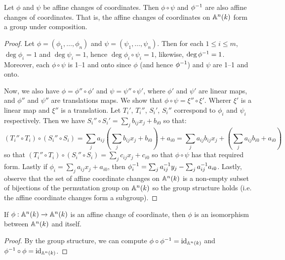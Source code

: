 \begin{theorem}\label{theorem_2.2.3}
  Let $\phi$ and $\psi$ be affine changes of coordinates. Then $\phi \circ \psi$
  and $\phi^{-1}$ are also affine changes of coordinates. That is, the affine
  changes of coordinates on $\mathbb{A}^n(k)$ form a group under composition.
\end{theorem}
\begin{proof}
  Let $\phi=(\phi_1, \dots, \phi_n)$ and $\psi=(\psi_1, \dots, \psi_n)$. Then
  for each $1 \leq i \leq m$, $\deg{\phi_i}=1$ and $\deg{\psi_i}=1$, hence
  $\deg{\phi_i \circ \psi_i}=1$, likewise, $\deg{\phi^{-1}}=1$. Moreover, each
  $\phi \circ \psi$ is 1--1 and onto since $\phi$ (and hence $\phi^{-1}$) and
  $\psi$ are 1--1 and onto.

  Now, we also have $\phi=\phi'' \circ \phi'$ and $\psi=\psi'' \circ \psi'$,
  where $\phi'$ and $\psi'$ are linear maps, and $\phi''$ and  $\psi''$ are
  translations maps. We show that $\phi \circ \psi=\xi'' \circ \xi'$. Wherer
  $\xi'$ is a linear map and  $\xi''$ is a translation. Let $T_i'$,  $T_i''$,
  $S_i'$,  $S_i''$ correspond to $\phi_i$ and  $\psi_i$ respectively. Then we
  have $S_i'' \circ S_i'=\sum_{j}{b_{ij}x_j}+b_{i0}$ so that:
  \begin{equation*}
    (T_i'' \circ T_i) \circ (S_i'' \circ S_i)=
    \sum_{j}{a_{ij}(\sum_{j}{b_{ij}x_j}+b_{i0})}+a_{i0}=
    \sum_j{a_{ij}b_{ij}x_j}+(\sum_{j}{a_{ij}b_{i0}}+a_{i0})
  \end{equation*}
  so that $(T_i'' \circ T_i) \circ (S_i'' \circ S_i)=\sum_{j}{c_{ij}x_j}+c_{i0}$
  so that $\phi \circ \psi$ has that required form. Lastly if
  $\phi_i=\sum_{j}{a_{ij}x_j}+a_{i0}$, then
  $\phi^{-1}_i=\sum_{j}{a_{ij}^{-1}y_j}-\sum_j{a_{ij}^{-1}a_{i0}}$. Lastly,
  observe that the set of affine coordinate changes on $\mathbb{A}^n(k)$ is a non-empty
  subset of bijections of the permutation group on $\mathbb{A}^n(k)$ so the group
  structure holds (i.e. the affine coordinate changes form a subgroup).
\end{proof}
\begin{corollary}
  If $\phi:\mathbb{A}^n(k) \xrightarrow{} \mathbb{A}^n(k)$ is an affine change of coordinate,
  then $\phi$ is an isomorphism between $\mathbb{A}^n(k)$ and itself.
\end{corollary}
\begin{proof}
  By the group structure, we can compute $\phi \circ \phi^{-1}=\operatorname{id}_{\mathbb{A}^n(k)}$
  and $\phi^{-1} \circ \phi=\operatorname{id}_{\mathbb{A}^n(k)}$.
\end{proof}

